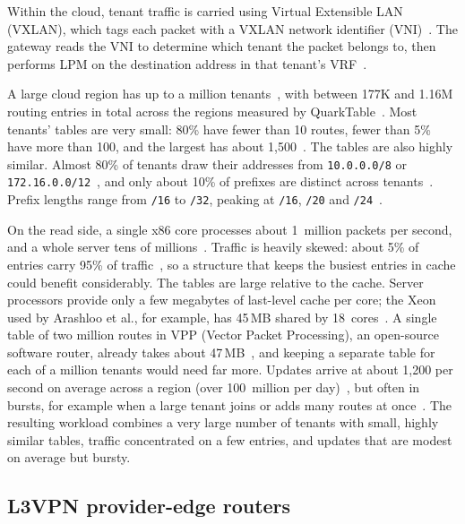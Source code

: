 \documentclass[11pt,a4paper,oneside]{report}
\newcommand{\pfx}[1]{\texttt{#1}}
\begin{document}
Within the cloud, tenant traffic is carried using Virtual Extensible LAN
(VXLAN), which tags each packet with a VXLAN network identifier
(VNI)~\cite{rfc7348}. The gateway reads the VNI to determine which tenant the
packet belongs to, then performs LPM on the destination address in that
tenant's VRF~\cite{pan2021sailfish}.

A large cloud region has up to a million tenants~\cite{pan2021sailfish}, with
between 177K and 1.16M routing entries in total across the regions measured by
QuarkTable~\cite{lu2024quarktable}. Most tenants' tables are very small: 80\%
have fewer than 10 routes, fewer than 5\% have more than 100, and the largest
has about 1,500~\cite{lu2024quarktable}. The tables are also highly similar.
Almost 80\% of tenants draw their addresses from \pfx{10.0.0.0/8} or
\pfx{172.16.0.0/12}~\cite{lu2024quarktable}, and only about 10\% of prefixes are
distinct across tenants~\cite{xu2024map}. Prefix lengths range from \pfx{/16} to
\pfx{/32}, peaking at \pfx{/16}, \pfx{/20} and \pfx{/24}~\cite{lu2024quarktable}.

On the read side, a single x86 core processes about 1~million packets per
second, and a whole server tens of millions~\cite{pan2021sailfish}. Traffic is
heavily skewed: about 5\% of entries carry 95\% of
traffic~\cite{pan2021sailfish}, so a structure that keeps the busiest entries in
cache could benefit considerably. The tables are large relative to the cache.
Server processors provide only a few megabytes of last-level cache per core; the
Xeon used by Arashloo et al., for example, has 45\,MB shared by
18~cores~\cite{arashloo2018}. A single table of two million routes in VPP
(Vector Packet Processing), an open-source software router, already takes about
47\,MB~\cite{vppscale}, and keeping a separate table for each of a million
tenants would need far more. Updates arrive at about 1,200 per second on average
across a region (over 100~million per day)~\cite{wei2023achelous}, but often in
bursts, for example when a large tenant joins or adds many routes at
once~\cite{pan2021sailfish}. The resulting workload combines a
very large number of tenants with small, highly similar tables, traffic
concentrated on a few entries, and updates that are modest on average but
bursty.

\subsection{L3VPN provider-edge routers}
\label{sec:pe}
\end{document}
